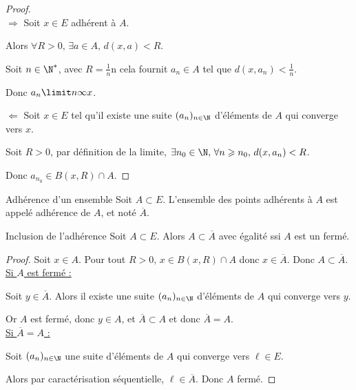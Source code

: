 \begin{proof}~\\
    $\Rightarrow$ Soit $x \in E$ adhérent à $A$. 

    Alors $\forall R > 0, \, \exists a \in A, \, d(x, a) < R$.

    Soit $n \in \N^*$, avec $R = \frac 1 n$n cela fournit $a_n \in A$ tel que $d(x, a_n) < \frac 1 n$.

    Donc $a_n \limit n \infty x$.

    $\Leftarrow$ Soit $x \in E$ tel qu'il existe une suite $(a_n)_{n \in \N}$ d'éléments 
    de $A$ qui converge vers $x$. 

    Soit $R > 0$, par définition de la limite, $\exists n_0 \in \N, \, \forall n \geqslant n_0, \, d(x, a_n) < R$.

    Donc $a_{n_0} \in B(x, R) \cap A$. 
\end{proof}

\begin{definition}{Adhérence d'un ensemble}{}
    Soit $A \subset E$. 
    L'ensemble des points adhérents à $A$ est appelé adhérence de $A$, et noté 
    $\overline{A}$.
\end{definition}

\begin{proposition}{Inclusion de l'adhérence}{}
    Soit $A \subset E$. Alors $A \subset \overline{A}$ avec égalité ssi $A$ est un fermé.
\end{proposition}

\begin{proof}
    Soit $x \in A$. Pour tout $R > 0, \, x \in B(x, R) \cap A$ donc $x \in \overline{A}$.
    Donc $A \subset \overline{A}$. \\

    \uline{Si $A$ est fermé :} 

    Soit $y \in \overline{A}$. Alors il existe une suite $(a_n)_{n \in \N}$ d'éléments
    de $A$ qui converge vers $y$.

    Or $A$ est fermé, donc $y \in A$, et $\overline{A} \subset A$ et donc $\overline{A} = A$. \\

    \uline{Si $\overline{A} = A$ : }

    \svspace Soit $(a_n)_{n \in \N}$ une suite d'éléments de $A$ qui converge vers $\ell \in E$.

    Alors par caractérisation séquentielle, $\ell \in \overline{A}$. Donc $A$ fermé. 
\end{proof}

